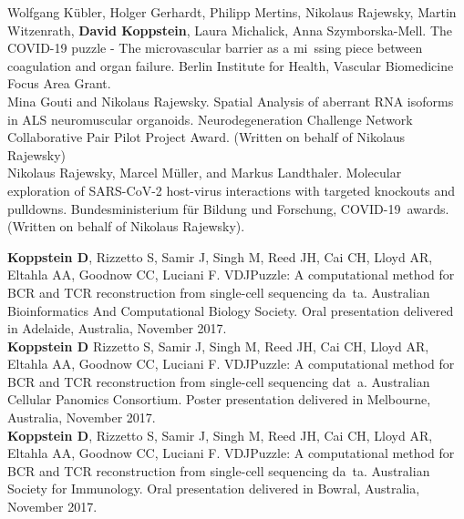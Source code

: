 \documentclass[10pt,a4paper]{article}
\begin{document}

{\noindent Wolfgang Kübler, Holger Gerhardt, Philipp Mertins, Nikolaus Rajewsky, Martin Witzenrath, \textbf{David Koppstein}, Laura Michalick, Anna Szymborska-Mell. The COVID-19 puzzle - The microvascular barrier as a mi\
ssing piece between coagulation and organ failure. Berlin Institute for Health, Vascular Biomedicine Focus Area Grant.}  \vspace{0.2em} \\

{\noindent Mina Gouti and Nikolaus Rajewsky. Spatial Analysis of aberrant RNA isoforms in ALS neuromuscular organoids. Neurodegeneration Challenge Network Collaborative Pair Pilot Project Award. (Written on behalf of Nikolaus Rajewsky)} \vspace{0.2em} \\

{\noindent Nikolaus Rajewsky, Marcel Müller, and Markus Landthaler. Molecular exploration of SARS-CoV-2 host-virus interactions with targeted knockouts and pulldowns. Bundesministerium für Bildung und Forschung, COVID-19\
 awards. (Written on behalf of Nikolaus Rajewsky)}. \vspace{0.2em} \\

\spacedhrule{0.1em}{-0.2em}  %

\roottitle{Presentations and Posters}

{\noindent \textbf{Koppstein D}, Rizzetto S, Samir J, Singh M, Reed JH, Cai CH, Lloyd AR, Eltahla AA, Goodnow CC, Luciani F. VDJPuzzle: A computational method for BCR and TCR reconstruction from single-cell sequencing da\
ta. Australian Bioinformatics And Computational Biology Society. Oral presentation delivered in Adelaide, Australia, November 2017.} \vspace{-0.8em} \\

{\noindent \textbf{Koppstein D} Rizzetto S, Samir J, Singh M, Reed JH, Cai CH, Lloyd AR, Eltahla AA, Goodnow CC, Luciani F. VDJPuzzle: A computational method for BCR and TCR reconstruction from single-cell sequencing dat\
a. Australian Cellular Panomics Consortium. Poster presentation delivered in Melbourne, Australia, November 2017.} \vspace{-0.8em} \\

{\noindent \textbf{Koppstein D}, Rizzetto S, Samir J, Singh M, Reed JH, Cai CH, Lloyd AR, Eltahla AA, Goodnow CC, Luciani F. VDJPuzzle: A computational method for BCR and TCR reconstruction from single-cell sequencing da\
ta. Australian Society for Immunology. Oral presentation delivered in Bowral, Australia, November 2017.} \vspace{-0.8em} \\
\end{document}
